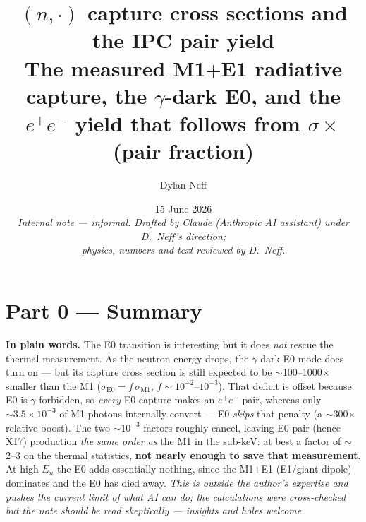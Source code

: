 \documentclass[11pt,a4paper]{article}
\title{\vspace{-1.2cm}
  {\Large\bfseries \He{3}$(n,\cdot)$\He{4} capture cross sections and the IPC
   pair yield}\\[2mm]
  {\large The measured M1$+$E1 radiative capture, the $\gamma$-dark E0, and the
   $e^+e^-$ yield that follows from $\sigma\times$(pair fraction)}}
\author{Dylan Neff}
\date{15 June 2026 \\[2mm]
  {\small\itshape Internal note --- informal. Drafted by Claude (Anthropic AI
  assistant) under D.~Neff's direction; \\ physics, numbers and text
  reviewed by D.~Neff.}}
\newcommand{\sM}{\sigma_{\mathrm{M1}}}
\newcommand{\sE}{\sigma_{\mathrm{E0}}}
\begin{document}
\maketitle
\vspace{-0.8cm}

\section*{Part 0 --- Summary}

\noindent\textbf{In plain words.} The E0 transition is interesting but it does
\emph{not} rescue the thermal measurement. As the neutron energy drops, the
$\gamma$-dark E0 mode does turn on --- but its capture cross section is still
expected to be $\sim$100--1000$\times$ smaller than the M1
($\sE=f\,\sM$, $f\sim10^{-2}$--$10^{-3}$). That deficit is offset because E0 is
$\gamma$-forbidden, so \emph{every} E0 capture makes an $e^+e^-$ pair, whereas
only $\sim3.5\times10^{-3}$ of M1 photons internally convert --- E0 \emph{skips}
that penalty (a $\sim$300$\times$ relative boost). The two $\sim10^{-3}$ factors
roughly cancel, leaving E0 pair (hence X17) production \emph{the same order as}
the M1 in the sub-keV: at best a factor of $\sim$2--3 on the thermal statistics,
\textbf{not nearly enough to save that measurement}. At high $E_n$ the E0 adds
essentially nothing, since the M1$+$E1 (E1/giant-dipole) dominates and the E0 has
died away. \emph{This is outside the author's expertise and pushes the current
limit of what AI can do; the calculations were cross-checked but the note should
be read skeptically --- insights and holes welcome.}

\medskip
\end{document}
